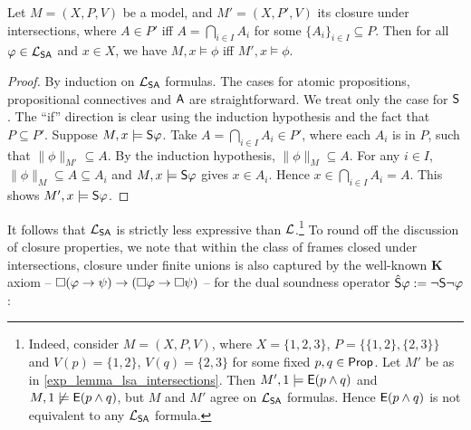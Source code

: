 \begin{lemma}
\label{exp_lemma_lsa_intersections}

    Let $M = (X, P, V)$ be a model, and $M' = (X, P', V)$ its closure under
    intersections, where $A \in P'$ iff $A = \bigcap_{i \in I}{A_i}$ for some
    $\{A_i\}_{i \in I} \subseteq P$. Then for all $\phi \in \cLSA$ and $x \in
    X$, we have $M, x \models \phi$ iff $M', x \models \phi$.

\end{lemma}

\begin{proof}

    By induction on $\cLSA$ formulas. The cases for atomic
    propositions, propositional connectives and $\A$ are straightforward. We
    treat only the case for $\S$.
    The ``if'' direction is clear using
    the induction hypothesis and the fact that $P \subseteq P'$. Suppose $M, x
    \models \S\phi$. Take $A = \bigcap_{i \in I}{A_i} \in P'$, where each $A_i$
    is in $P$, such that $\|\phi\|_{M'} \subseteq A$. By the induction
    hypothesis, $\|\phi\|_M \subseteq A$. For any $i \in I$, $\|\phi\|_M
    \subseteq A \subseteq A_i$ and $M, x \models \S\phi$ gives $x \in A_i$.
    Hence $x \in \bigcap_{i \in I}{A_i} = A$. This shows $M', x \models
    \S\phi$.
\end{proof}

It follows that $\cLSA$ is strictly less expressive than $\cL$.\footnote{
    Indeed, consider $M = (X, P, V)$, where $X = \{1, 2, 3\}$, $P = \{\{1, 2\}, \{2,
    3\}\}$ and $V(p) = \{1, 2\}$, $V(q) = \{2, 3\}$ for some fixed $p, q \in
    \Prop$. Let $M'$ be as in \cref{exp_lemma_lsa_intersections}. Then $M', 1
    \models \E(p \land q)$ and $M, 1 \not\models \E(p \land q)$, but $M$ and
    $M'$ agree on $\cLSA$ formulas. Hence $\E(p \land q)$ is not equivalent to
    any $\cLSA$ formula.
}
%
To round off the discussion of closure properties, we note that within the
class of frames closed under intersections, closure under finite unions is also
captured by the well-known \textbf{K} axiom -- $\modalnec(\phi \limplies \psi)
\limplies (\modalnec\phi \limplies \modalnec\psi)$ -- for the dual soundness operator
$\hat{\S}\phi := \neg\S\neg\phi$:

